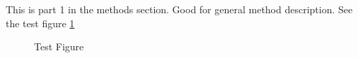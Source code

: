 This is part 1 in the methods section. Good for general method description. See the test figure \ref{fi:test}

\begin{figure}
  \centering
  
  \caption{Test Figure}\label{fi:test}
\end{figure}
